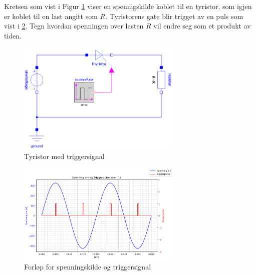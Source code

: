 \begin{question}[name=Spørsmål, topic=tyristor]
Kretsen som vist i Figur \ref{fig:tyrTriggplot} viser en spennigskilde koblet til en tyristor, som igjen er koblet til en last angitt som $R$. Tyristorens gate blir trigget av en puls som vist i \ref{fig:tyrForTriggplot}. Tegn hvordan spenningen over lasten $R$ vil endre seg som et produkt av tiden.
\begin{figure}[H]
	\centering
	\includegraphics[width=0.7\textwidth]{tyristor/figurer/tyristor.png}
	\caption{Tyristor med triggersignal}
	\label{fig:tyrTriggplot}
\end{figure}

\begin{figure}[H]
	\centering
	\includegraphics[width=0.7\textwidth]{tyristor/plot/tyristor3.png}
	\caption{Forløp for spenningskilde og triggersignal}
	\label{fig:tyrForTriggplot}
\end{figure}


\end{question}

\vspace{0.5cm} %

